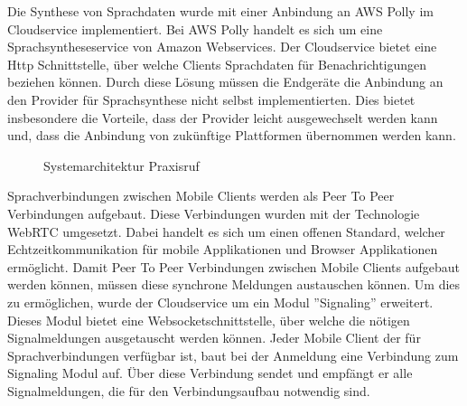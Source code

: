 Die Synthese von Sprachdaten wurde mit einer Anbindung an AWS Polly im Cloudservice implementiert.
Bei AWS Polly handelt es sich um eine Sprachsyntheseservice von Amazon Webservices.\cite{aws_polly}
Der Cloudservice bietet eine Http Schnittstelle, über welche Clients Sprachdaten für Benachrichtigungen beziehen können.
Durch diese Lösung müssen die Endgeräte die Anbindung an den Provider für Sprachsynthese nicht selbst implementierten.
Dies bietet insbesondere die Vorteile, dass der Provider leicht ausgewechselt werden kann und, dass die Anbindung von zukünftige Plattformen übernommen werden kann.

\begin{figure}[h]
    \centering
    \begin{minipage}[b]{0.7\textwidth}
        \caption{Systemarchitektur Praxisruf}
    \end{minipage}
\end{figure}

Sprachverbindungen zwischen Mobile Clients werden als Peer To Peer Verbindungen aufgebaut.
Diese Verbindungen wurden mit der Technologie WebRTC umgesetzt.
Dabei handelt es sich um einen offenen Standard, welcher Echtzeitkommunikation für mobile Applikationen und Browser Applikationen ermöglicht.\cite{webrtc}
Damit Peer To Peer Verbindungen zwischen Mobile Clients aufgebaut werden können, müssen diese synchrone Meldungen austauschen können.
Um dies zu ermöglichen, wurde der Cloudservice um ein Modul ''Signaling'' erweitert.
Dieses Modul bietet eine Websocketschnittstelle, über welche die nötigen Signalmeldungen ausgetauscht werden können.
Jeder Mobile Client der für Sprachverbindungen verfügbar ist, baut bei der Anmeldung eine Verbindung zum Signaling Modul auf.
Über diese Verbindung sendet und empfängt er alle Signalmeldungen, die für den Verbindungsaufbau notwendig sind.

